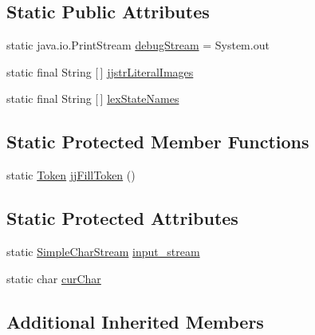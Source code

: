 \subsection*{Static Public Attributes}
\begin{DoxyCompactItemize}
\item 
static java.\+io.\+Print\+Stream \mbox{\hyperlink{classorg_1_1tec_1_1comp_1_1interpreter_1_1_test_token_manager_a618391c4cb9b9862dacc1c552607211e}{debug\+Stream}} = System.\+out
\item 
static final String \mbox{[}$\,$\mbox{]} \mbox{\hyperlink{classorg_1_1tec_1_1comp_1_1interpreter_1_1_test_token_manager_a7106cb11b5b6214273121b2d1665600d}{jjstr\+Literal\+Images}}
\item 
static final String \mbox{[}$\,$\mbox{]} \mbox{\hyperlink{classorg_1_1tec_1_1comp_1_1interpreter_1_1_test_token_manager_a9bc8225846c73fbb7d7e0b9af407eb9c}{lex\+State\+Names}}
\end{DoxyCompactItemize}
\subsection*{Static Protected Member Functions}
\begin{DoxyCompactItemize}
\item 
static \mbox{\hyperlink{classorg_1_1tec_1_1comp_1_1interpreter_1_1_token}{Token}} \mbox{\hyperlink{classorg_1_1tec_1_1comp_1_1interpreter_1_1_test_token_manager_a05ab043040771823ab9b1357f993e9fb}{jj\+Fill\+Token}} ()
\end{DoxyCompactItemize}
\subsection*{Static Protected Attributes}
\begin{DoxyCompactItemize}
\item 
static \mbox{\hyperlink{classorg_1_1tec_1_1comp_1_1interpreter_1_1_simple_char_stream}{Simple\+Char\+Stream}} \mbox{\hyperlink{classorg_1_1tec_1_1comp_1_1interpreter_1_1_test_token_manager_ab1d470a5cba35fd97384724686ec29b8}{input\+\_\+stream}}
\item 
static char \mbox{\hyperlink{classorg_1_1tec_1_1comp_1_1interpreter_1_1_test_token_manager_a6860e73f9228b0c328e4e8b7d329b0be}{cur\+Char}}
\end{DoxyCompactItemize}
\subsection*{Additional Inherited Members}


